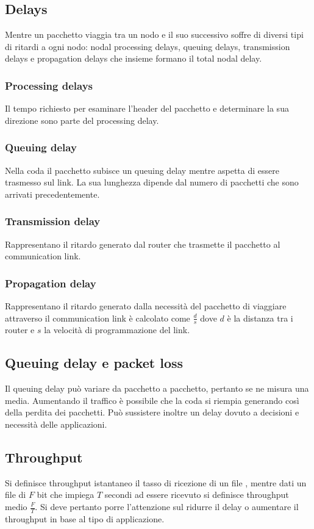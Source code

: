 \subsection{Delays}
Mentre un pacchetto viaggia tra un nodo e il suo successivo soffre di diversi tipi di ritardi a ogni nodo: nodal processing delays, queuing delays, transmission delays e propagation delays che insieme formano il
total nodal delay. 
\subsubsection{Processing delays}
Il tempo richiesto per esaminare l'header del pacchetto e determinare la sua direzione sono parte del processing delay. 
\subsubsection{Queuing delay}
Nella coda il pacchetto subisce un queuing delay mentre aspetta di essere trasmesso sul link. La sua lunghezza dipende dal numero di pacchetti che sono arrivati precedentemente. 
\subsubsection{Transmission delay}
Rappresentano il ritardo generato dal router che trasmette il pacchetto al communication link.
\subsubsection{Propagation delay}
Rappresentano il ritardo generato dalla necessit\`a del pacchetto di viaggiare attraverso il communication link \`e calcolato come $\frac{d}{s}$ dove $d$ \`e la distanza tra i router e $s$ la velocit\`a di 
programmazione del link. 
\subsection{Queuing delay e packet loss}
Il queuing delay pu\`o variare da pacchetto a pacchetto, pertanto se ne misura una media. Aumentando il traffico \`e possibile che la coda si riempia generando cos\`i della perdita dei pacchetti. Pu\`o sussistere
inoltre un delay dovuto a decisioni e necessit\`a delle applicazioni.
\subsection{Throughput}
Si definisce throughput istantaneo il tasso di ricezione di un file , mentre dati un file di $F$ bit che impiega $T$ secondi ad essere ricevuto si definisce throughput medio $\frac{F}{T}$. Si deve pertanto porre
l'attenzione sul ridurre il delay o aumentare il throughput in base al tipo di applicazione.
